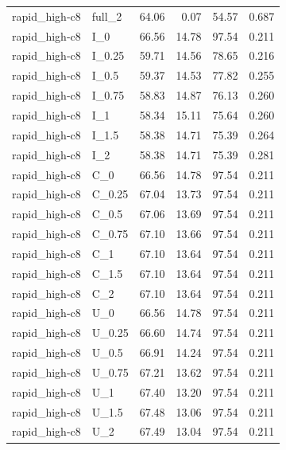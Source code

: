 \begin{longtable}{llrrrr}
rapid\_high-c8 & full\_2 & 64.06 & 0.07 & 54.57 & 0.687\\
rapid\_high-c8 & I\_0 & 66.56 & 14.78 & 97.54 & 0.211\\
rapid\_high-c8 & I\_0.25 & 59.71 & 14.56 & 78.65 & 0.216\\
rapid\_high-c8 & I\_0.5 & 59.37 & 14.53 & 77.82 & 0.255\\
rapid\_high-c8 & I\_0.75 & 58.83 & 14.87 & 76.13 & 0.260\\
rapid\_high-c8 & I\_1 & 58.34 & 15.11 & 75.64 & 0.260\\
rapid\_high-c8 & I\_1.5 & 58.38 & 14.71 & 75.39 & 0.264\\
rapid\_high-c8 & I\_2 & 58.38 & 14.71 & 75.39 & 0.281\\
rapid\_high-c8 & C\_0 & 66.56 & 14.78 & 97.54 & 0.211\\
rapid\_high-c8 & C\_0.25 & 67.04 & 13.73 & 97.54 & 0.211\\
rapid\_high-c8 & C\_0.5 & 67.06 & 13.69 & 97.54 & 0.211\\
rapid\_high-c8 & C\_0.75 & 67.10 & 13.66 & 97.54 & 0.211\\
rapid\_high-c8 & C\_1 & 67.10 & 13.64 & 97.54 & 0.211\\
rapid\_high-c8 & C\_1.5 & 67.10 & 13.64 & 97.54 & 0.211\\
rapid\_high-c8 & C\_2 & 67.10 & 13.64 & 97.54 & 0.211\\
rapid\_high-c8 & U\_0 & 66.56 & 14.78 & 97.54 & 0.211\\
rapid\_high-c8 & U\_0.25 & 66.60 & 14.74 & 97.54 & 0.211\\
rapid\_high-c8 & U\_0.5 & 66.91 & 14.24 & 97.54 & 0.211\\
rapid\_high-c8 & U\_0.75 & 67.21 & 13.62 & 97.54 & 0.211\\
rapid\_high-c8 & U\_1 & 67.40 & 13.20 & 97.54 & 0.211\\
rapid\_high-c8 & U\_1.5 & 67.48 & 13.06 & 97.54 & 0.211\\
rapid\_high-c8 & U\_2 & 67.49 & 13.04 & 97.54 & 0.211\\
\bottomrule\end{longtable}